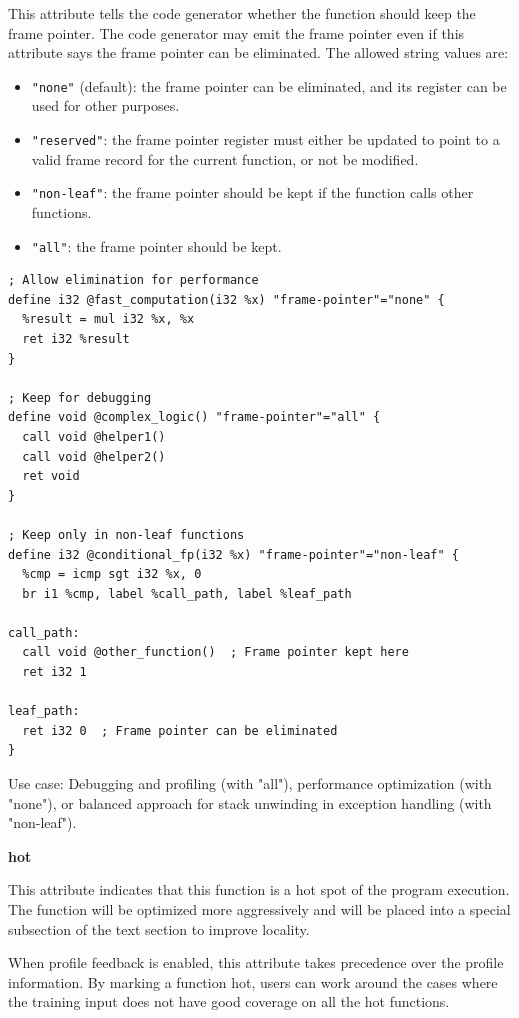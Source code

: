 This attribute tells the code generator whether the function should keep the frame pointer.
The code generator may emit the frame pointer even if this attribute says the frame pointer can be eliminated.
The allowed string values are:

\begin{itemize}[noitemsep]
  \item \texttt{"none"} (default): the frame pointer can be eliminated, and its register can be used for other purposes.
  \item \texttt{"reserved"}: the frame pointer register must either be updated to point to a valid frame record for the current function, or not be modified.
  \item \texttt{"non-leaf"}: the frame pointer should be kept if the function calls other functions.
  \item \texttt{"all"}: the frame pointer should be kept.
\end{itemize}

\begin{lstlisting}[style=ir]
; Allow elimination for performance
define i32 @fast_computation(i32 %x) "frame-pointer"="none" {
  %result = mul i32 %x, %x
  ret i32 %result
}

; Keep for debugging
define void @complex_logic() "frame-pointer"="all" {
  call void @helper1()
  call void @helper2()
  ret void
}

; Keep only in non-leaf functions
define i32 @conditional_fp(i32 %x) "frame-pointer"="non-leaf" {
  %cmp = icmp sgt i32 %x, 0
  br i1 %cmp, label %call_path, label %leaf_path

call_path:
  call void @other_function()  ; Frame pointer kept here
  ret i32 1

leaf_path:
  ret i32 0  ; Frame pointer can be eliminated
}
\end{lstlisting}

Use case: Debugging and profiling (with "all"), performance optimization (with "none"), or balanced approach for stack unwinding in exception handling (with "non-leaf").

\textbf{hot}

This attribute indicates that this function is a hot spot of the program execution.
The function will be optimized more aggressively and will be placed into a special subsection of the text section to improve locality.

When profile feedback is enabled, this attribute takes precedence over the profile information.
By marking a function hot, users can work around the cases where the training input does not have good coverage on all the hot functions.

